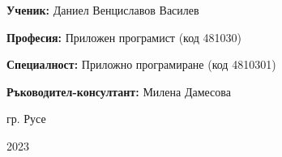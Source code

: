 \vspace*{\fill}

\textbf{Ученик:}
Даниел Венциславов Василев

\textbf{Професия:}
Приложен програмист (код 481030)

\textbf{Специалност:}
Приложно програмиране (код 4810301)

\hfill

\textbf{Ръководител-консултант:}
Милена Дамесова

\hfill

\hfill

\begin{center}
гр. Русе

2023
\end{center}

\thispagestyle{empty}
